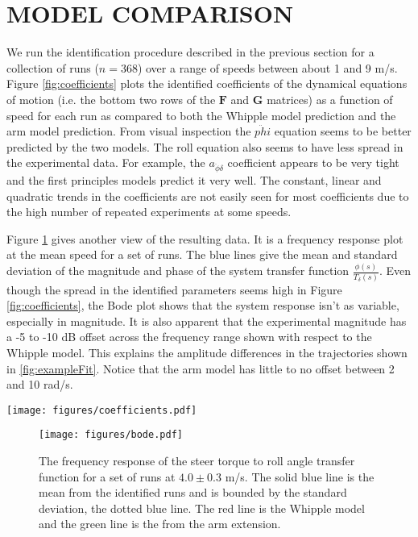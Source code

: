 \documentclass[twocolumn,10pt]{asme2e}
\begin{document}
\section*{MODEL COMPARISON}
We run the identification procedure described in the previous section for a
collection of runs ($n=368$) over a range of speeds between about 1 and 9 m/s.
Figure \ref{fig:coefficients} plots the identified coefficients of the
dynamical equations of motion (i.e. the bottom two rows of the \(\mathbf{F}\)
and \(\mathbf{G}\) matrices) as a function of speed for each run as compared to
both the Whipple model prediction and the arm model prediction. From visual
inspection the $\ddot{phi}$ equation seems to be better predicted by the two
models. The roll equation also seems to have less spread in the experimental data. For
example, the \(a_{\ddot{\phi}\delta}\) coefficient appears to be very tight and the
first principles models predict it very well. The constant, linear and
quadratic trends in the coefficients are not easily seen for most coefficients
due to the high number of repeated experiments at some speeds.

Figure \ref{fig:bode} gives another view of the resulting data. It is a
frequency response plot at the mean speed for a set of runs. The blue lines
give the mean and standard deviation of the magnitude and phase of the system
transfer function \(\frac{\phi(s)}{T_\delta(s)}\). Even though the spread in
the identified parameters seems high in Figure \ref{fig:coefficients}, the Bode
plot shows that the system response isn't as variable, especially in magnitude.
It is also apparent that the experimental magnitude has a -5 to -10 dB offset
across the frequency range shown with respect to the Whipple model. This
explains the amplitude differences in the trajectories shown in
\ref{fig:exampleFit}. Notice that the arm model has little to no offset between
2 and 10 rad/s.

\begin{figure*}
	\texttt{[image: figures/coefficients.pdf]}
	\caption{The coefficients of the linear dynamical equations of motion plotted
	as a function of speed. Each blue dot is a single experiment. The green line
	is the Whipple model and the magenta line is the Arm model. Only experiments
	with a mean fit percentage greater than zero are shown.}
	\label{fig:coefficients}
\end{figure*}

\begin{figure}
	\texttt{[image: figures/bode.pdf]}
	\caption{The frequency response of the steer torque to roll angle transfer
	function for a set of runs at $4.0 \pm 0.3$ m/s. The solid blue line is the
	mean from the identified runs and is bounded by the standard deviation, the
	dotted blue line. The red line is the Whipple model and the green line is the
	from the arm extension.}
	\label{fig:bode}
\end{figure}
\end{document}
